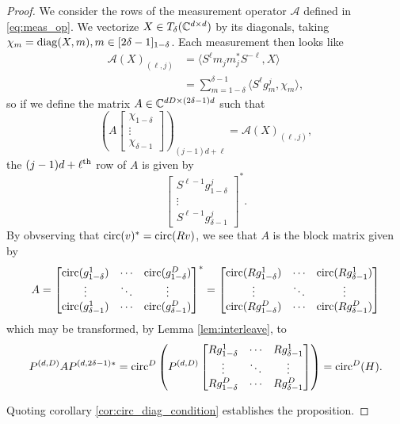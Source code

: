 \begin{proof}
We consider the rows of the measurement operator $\mathcal{A}$ defined in \eqref{eq:meas_op}.  We vectorize $X \in T_\delta(\mathbb{C}^{d \times d})$ by its diagonals, taking $\chi_m = \operatorname{diag}(X, m), m \in [2 \delta - 1]_{1 - \delta}$.  Each measurement then looks like \begin{align*} \mathcal{A}(X)_{(\ell, j)} &= \langle S^{\ell} m_j m_j^* S^{-\ell}, X \rangle \\ &= \sum_{m = 1 - \delta}^{\delta - 1} \langle S^{\ell} g_m^j, \chi_m \rangle,\end{align*} so if we define the matrix $A \in \mathbb{C}^{dD \times (2 \delta - 1)d}$ such that \begin{equation}\left(A \begin{bmatrix} \chi_{1 - \delta} \\ \vdots \\ \chi_{\delta - 1} \end{bmatrix}\right)_{(j-1) d + \ell} = \mathcal{A}(X)_{(\ell, j)}, \label{eq:vectorized_meas}\end{equation} the $(j - 1) d + \ell^{\text{th}}$ row of $A$ is given by \[\begin{bmatrix} S^{\ell - 1} g_{1 - \delta}^j \\ \vdots \\ S^{\ell - 1} g_{\delta - 1}^j \end{bmatrix}^*.\] By obvserving that $\operatorname{circ}(v)^* = \operatorname{circ}(Rv)$, we see that $A$ is the block matrix given by \[A = \begin{bmatrix} \operatorname{circ}(g_{1 - \delta}^1) & \cdots & \operatorname{circ}(g_{1 - \delta}^D) \\ \vdots & \ddots & \vdots \\ \operatorname{circ}(g_{\delta - 1}^1) & \cdots & \operatorname{circ}(g_{\delta - 1}^D) \end{bmatrix}^* = \begin{bmatrix} \operatorname{circ}(R g_{1 - \delta}^1) & \cdots & \operatorname{circ}(R g_{\delta - 1}^1) \\ \vdots & \ddots & \vdots \\ \operatorname{circ}(R g_{1 - \delta}^D) & \cdots & \operatorname{circ}(R g_{\delta - 1}^D) \end{bmatrix}\] which may be transformed, by Lemma \ref{lem:interleave}, to \begin{equation}P^{(d, D)} A P^{(d, 2 \delta - 1)*} = \operatorname{circ}^D\left(P^{(d, D)} \begin{bmatrix} R g_{1 - \delta}^1 & \cdots & R g_{\delta - 1}^1 \\ \vdots & \ddots & \vdots \\ R g_{1 - \delta}^D & \cdots & R g_{\delta - 1}^D \end{bmatrix}\right) = \operatorname{circ}^D(H). \label{eq:interleaved_meas}\end{equation}

Quoting corollary \ref{cor:circ_diag_condition} establishes the proposition.
\end{proof}

